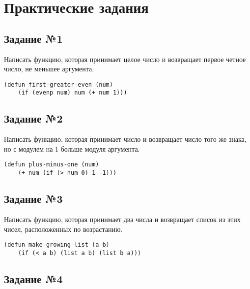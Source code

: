 \chapter{Практические задания}

\section{Задание №1}

Написать функцию, которая принимает целое число и возвращает первое четное
число, не меньшее аргумента.

\vspace{4mm}
\hfill
\begin{minipage}{0.92\linewidth}
\begin{lstlisting}
(defun first-greater-even (num)
    (if (evenp num) num (+ num 1)))
\end{lstlisting}
\end{minipage}


\section{Задание №2}

Написать функцию, которая принимает число и возвращает число того же знака, но с
модулем на 1 больше модуля аргумента.

\vspace{4mm}
\begin{minipage}{0.92\linewidth}
\begin{lstlisting}
(defun plus-minus-one (num)
    (+ num (if (> num 0) 1 -1)))
\end{lstlisting}
\end{minipage}

\section{Задание №3}

Написать функцию, которая принимает два числа и возвращает список из этих чисел,
расположенных по возрастанию.

\vspace{4mm}
\begin{minipage}{0.92\linewidth}
\begin{lstlisting}
(defun make-growing-list (a b)
    (if (< a b) (list a b) (list b a)))
\end{lstlisting}
\end{minipage}

\section{Задание №4}

